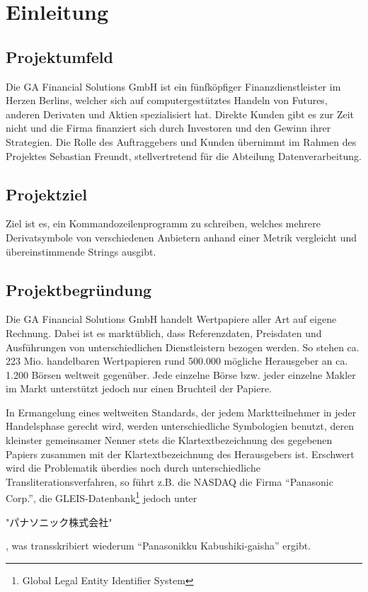 \section{Einleitung}
\subsection{Projektumfeld}
Die GA Financial Solutions GmbH ist ein fünfköpfiger Finanzdienstleister im
Herzen Berlins, welcher sich auf computergestütztes Handeln
von Futures, anderen Derivaten und Aktien spezialisiert hat. Direkte Kunden gibt es zur Zeit
nicht und die Firma finanziert sich durch Investoren und den Gewinn ihrer
Strategien. Die Rolle des Auftraggebers und Kunden übernimmt im Rahmen des
Projektes Sebastian Freundt, stellvertretend für die Abteilung Datenverarbeitung.\par

\subsection{Projektziel}
Ziel ist es, ein Kommandozeilenprogramm zu schreiben, welches mehrere Derivatsymbole 
von verschiedenen Anbietern anhand einer Metrik vergleicht und übereinstimmende 
Strings ausgibt.\par

\subsection{Projektbegründung}
Die GA Financial Solutions GmbH handelt Wertpapiere aller Art auf eigene
Rechnung.  Dabei ist es marktüblich, dass Referenzdaten, Preisdaten
und Ausführungen von unterschiedlichen Dienstleistern bezogen werden.
So stehen ca. 223 Mio. handelbaren Wertpapieren rund 500.000 mögliche
Herausgeber an ca. 1.200 Börsen weltweit gegenüber.  Jede einzelne
Börse bzw. jeder einzelne Makler im Markt unterstützt jedoch nur
einen Bruchteil der Papiere.\par

In Ermangelung eines weltweiten Standards, der jedem Marktteilnehmer in
jeder Handelsphase gerecht wird, werden unterschiedliche Symbologien
benutzt, deren kleinster gemeinsamer Nenner stets die
Klartextbezeichnung des gegebenen Papiers zusammen mit der
Klartextbezeichnung des Herausgebers ist. Erschwert wird die
Problematik überdies noch durch unterschiedliche Transliterationsverfahren,
so führt z.B. die NASDAQ die Firma "`Panasonic Corp."',
die GLEIS-Datenbank\footnote{Global Legal Entity Identifier System} jedoch unter
\begin{CJK}{UTF8}{min}
"パナソニック株式会社"
\end{CJK}%
, was transskribiert wiederum "`Panasonikku Kabushiki-gaisha"' ergibt. \par

